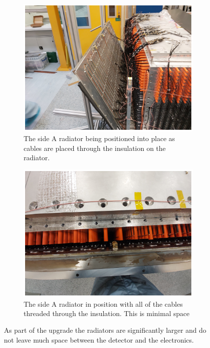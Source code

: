 \begin{figure}[htbp]
\centering
\begin{subfigure}{.5\textwidth}
  \centering
  \includegraphics[width=\linewidth]{Chapter3/Figs/Raster/detCon026b_HaningOffRadiator.png}
  \captionsetup{width=.9\linewidth}
  \caption{The side A radiator being positioned into place as cables are placed through the insulation on the radiator.}
  \label{subFig:detCon026b_HaningOffRadiator}
\end{subfigure}%
\begin{subfigure}{.5\textwidth}
  \centering
  \includegraphics[width=\linewidth]{Chapter3/Figs/Raster/detCon028b_RadiatorTopDown.png}
  \captionsetup{width=.9\linewidth}
  \caption{The side A radiator in position with all of the cables threaded through the insulation. This is minimal space}
  \label{subFig:detCon028b_RadiatorTopDown}
\end{subfigure}
\caption{As part of the upgrade the radiators are significantly larger and do not leave much space between the detector and the electronics.}
\label{fig:detCon_HaningOffRadiator_RadiatorTopDown}
\end{figure}


